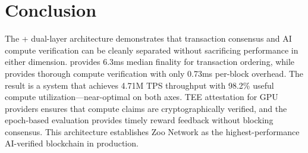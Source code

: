 \section{Conclusion}


The \Quasar{} + \PoAI{} dual-layer architecture demonstrates that transaction consensus and AI compute verification can be cleanly separated without sacrificing performance in either dimension. \Quasar{} provides 6.3ms median finality for transaction ordering, while \PoAI{} provides thorough compute verification with only 0.73ms per-block overhead. The result is a system that achieves 4.71M TPS throughput with 98.2\% useful compute utilization---near-optimal on both axes. TEE attestation for GPU providers ensures that compute claims are cryptographically verified, and the epoch-based evaluation provides timely reward feedback without blocking consensus. This architecture establishes Zoo Network as the highest-performance AI-verified blockchain in production.

